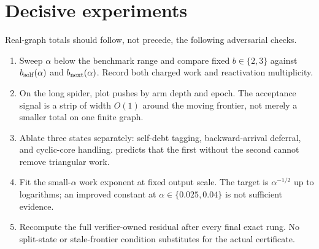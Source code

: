 \section{Decisive experiments}
\label{sec:experiments}

Real-graph totals should follow, not precede, the following adversarial
checks.

\begin{enumerate}[leftmargin=*]
 \item Sweep $\alpha$ below the benchmark range and compare fixed
 $b\in\{2,3\}$ against $b_{\rm self}(\alpha)$ and
 $b_{\rm next}(\alpha)$.  Record both charged work and reactivation
 multiplicity.
 \item On the long spider, plot pushes by arm depth and epoch.  The acceptance
 signal is a strip of width $O(1)$ around the moving frontier, not merely a
 smaller total on one finite graph.
 \item Ablate three states separately: self-debt tagging, backward-arrival
 deferral, and cyclic-core handling.   predicts that the
 first without the second cannot remove triangular work.
 \item Fit the small-$\alpha$ work exponent at fixed output scale.  The target
 is $\alpha^{-1/2}$ up to logarithms; an improved constant at
 $\alpha\in\{0.025,0.04\}$ is not sufficient evidence.
 \item Recompute the full verifier-owned residual after every final exact
 rung.  No split-state or stale-frontier condition substitutes for the actual
 certificate.
\end{enumerate}
